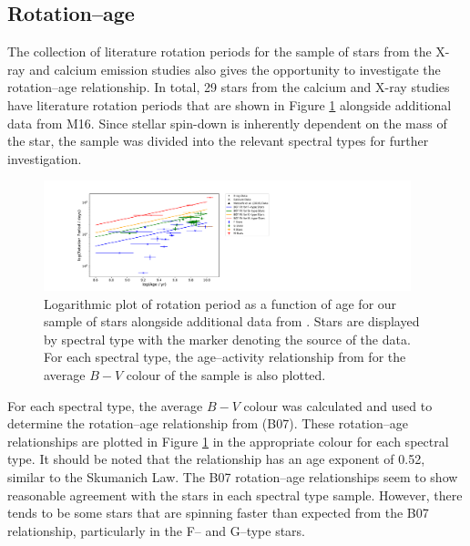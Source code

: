\subsection{Rotation--age}
\label{Chp5_results_rotation_age}
The collection of literature rotation periods for the sample of stars from the X-ray and calcium emission studies also gives the opportunity to investigate the rotation--age relationship. In total, 29 stars from the calcium and X-ray studies have literature rotation periods that are shown in Figure \ref{fig:full_sample_prot_v_age} alongside additional data from M16. Since stellar spin-down is inherently dependent on the mass of the star, the sample was divided into the relevant spectral types for further investigation.

\begin{figure}[!ht]
    \centering
    \includegraphics[width=0.95\textwidth]{Figures/5-Activity_rotation/prot_v_age_with_B07.pdf}
    \caption[Rotation period as a function of age for full sample]{Logarithmic plot of rotation period as a function of age for our sample of stars alongside additional data from \citet{Metcalfe_etal_2016}. Stars are displayed by spectral type with the marker denoting the source of the data. For each spectral type, the age--activity relationship from \citet{Barnes_2007} for the average $B-V$ colour of the sample is also plotted.}
    \label{fig:full_sample_prot_v_age}
\end{figure}

For each spectral type, the average $B-V$ colour was calculated and used to determine the rotation--age relationship from \citet{Barnes_2007} (B07). These rotation--age relationships are plotted in Figure \ref{fig:full_sample_prot_v_age} in the appropriate colour for each spectral type. It should be noted that the \citet{Barnes_2007} relationship has an age exponent of 0.52, similar to the Skumanich Law. The B07 rotation--age relationships seem to show reasonable agreement with the stars in each spectral type sample. However, there tends to be some stars that are spinning faster than expected from the B07 relationship, particularly in the F-- and G--type stars.

